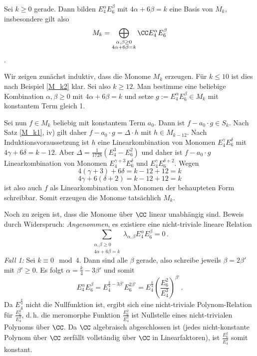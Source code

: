 
\begin{satz}
Sei $k \geq 0$ gerade. Dann bilden $E_4^\alpha E_6^\beta$ mit $4\alpha + 6\beta = k$ eine Basis von $M_k$, insbesondere gilt also
\[
M_k = \bigoplus_{\substack{\alpha, \beta \geq 0\\ 4\alpha + 6\beta = k}} \CC E_4^\alpha E_6^\beta
\].
\end{satz}

\begin{bewe}
Wir zeigen zunächst induktiv, dass die Monome $M_k$ erzeugen. Für $k \leq 10$ ist dies nach Beispiel \ref{M_k2} klar. Sei also $k \geq 12$. Man bestimme eine beliebige Kombination $\alpha, \beta \geq 0$ mit $4 \alpha + 6 \beta = k$ und setze $g := E_4^\alpha E_6^\beta \in M_k$ mit konstantem Term gleich 1.

Sei nun $f \in M_k$ beliebig mit konstantem Term $a_0$. Dann ist $f - a_0 \cdot g \in S_k$. Nach Satz \ref{M_k1}, iv) gilt daher $f - a_0 \cdot g = \Delta \cdot h$ mit $h \in M_{k-12}$. Nach Induktionsvoraussetzung ist $h$ eine Linearkombination von Monomen $E_4^\gamma E_6^\delta$ mit $4 \gamma + 6 \delta = k - 12$. Aber $\Delta = \frac{1}{1728} (E_4^3 - E_6^2)$ und daher ist $f - a_0 \cdot g$ Linearkombination von Monomen $E_4^{\gamma + 3}E_6^{\delta}$ und $E_4^{\gamma}E_6^{\delta + 2}$. Wegen
\[
4(\gamma + 3) + 6 \delta = k - 12 + 12 = k
\]
\[
4 \gamma + 6 (\delta + 2) = k - 12 + 12 = k
\]
ist also auch $f$ als Linearkombination von Monomen der behaupteten Form schreibbar. Somit erzeugen die Monome tatsächlich $M_k$.

Noch zu zeigen ist, dass die Monome über $\CC$ linear unabhängig sind. Beweis durch Widerspruch: \emph{Angenommen}, es existiere eine nicht-triviale lineare Relation
\[
\sum_{\substack{\alpha, \beta \geq 0\\ 4 \alpha + 6 \beta = k}} \lambda_{\alpha, \beta} E_4^\alpha E_6^\beta = 0
\,.
\]
\emph{Fall 1:} Sei $k \equiv 0 \mod 4$. Dann sind alle $\beta$ gerade, also schreibe jeweils $\beta = 2 \beta'$ mit $\beta' \geq 0$. Es folgt $\alpha = \frac k4 - 3 \beta'$ und somit
\[
E_4^\alpha E_6^\beta = E_4^{\frac k4 - 3\beta'}E_6^{2\beta'} = E_4^{\frac k4} \left( \frac {E_6^2}{E_4^3} \right)^{\beta'}
\,.
\]
Da $E_4^{\frac k4}$ nicht die Nullfunktion ist, ergibt sich eine nicht-triviale Polynom-Relation für $\frac{E_6^2}{E_4^3}$, d.\,h. die meromorphe Funktion $\frac{E_6^2}{E_4^3}$ ist Nullstelle eines nicht-trivialen Polynoms über $\CC$. Da $\CC$ algebraisch abgeschlossen ist (jedes nicht-konstante Polynom über $\CC$ zerfällt vollständig über $\CC$ in Linearfaktoren), ist $\frac{E_6^2}{E_4^3}$ somit konstant.


\end{bewe}
